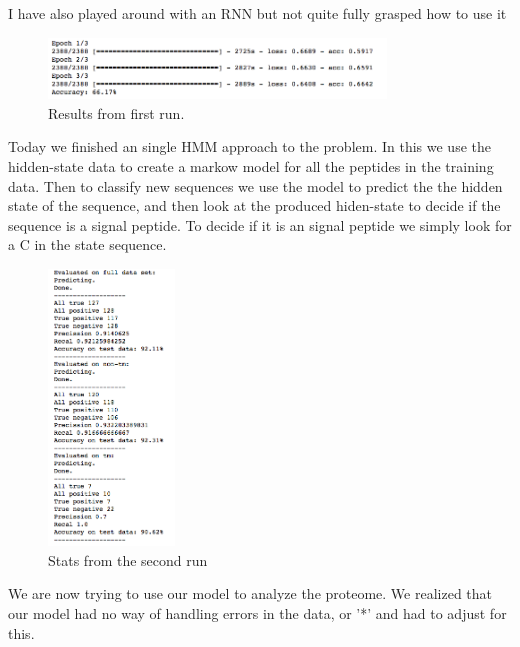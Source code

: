 \documentclass[a4paper]{tufte-handout}
\begin{document}
I have also played around with an RNN but not quite fully grasped how to use it 

\begin{figure}
    \begin{center}
      \includegraphics[width=0.8\textwidth]{./pics/first_run.png}
    \end{center}
    \caption{Results from first run.}
\end{figure}





Today we finished an single HMM approach to the problem. In this we use the
hidden-state data to create a markow model for all the peptides in the training
data. Then to classify new sequences we use the model to predict the the hidden
state of the sequence, and then look at the produced hiden-state to decide if
the sequence is a signal peptide. To decide if it is an signal peptide we simply look for a C in the state sequence.

\begin{figure}
    \begin{center}
      \includegraphics[width=0.3\textwidth]{pics/second_hmm_run.png}
    \end{center}
    \caption{Stats from the second run}
\end{figure}


We are now trying to use our model to analyze the proteome. We realized that
our model had no way of handling errors in the data, or '*' and had to adjust
for this. 
\end{document}
